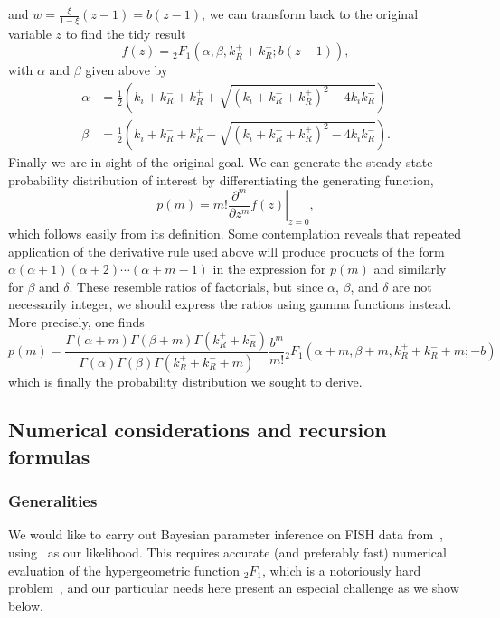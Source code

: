 and $w = \frac{\xi}{1-\xi} (z-1) = b (z-1)$,
we can transform back to the original variable $z$ to find the tidy result
\begin{equation}
f(z) =  {_2F_1}(\alpha, \beta, k_R^+ + k_R^-; b(z-1)),
\end{equation}
with $\alpha$ and $\beta$ given above by
\begin{equation}
\begin{split}
\alpha &= \frac{1}{2}
\left(k_i+k_R^-+k_R^+ + \sqrt{(k_i+k_R^-+k_R^+)^2 - 4k_i k_R^-}\right)
\\
\beta &= \frac{1}{2}
\left(k_i+k_R^-+k_R^+ - \sqrt{(k_i+k_R^-+k_R^+)^2 - 4k_i k_R^-}\right).
\end{split}
\end{equation}
Finally we are in sight of the original goal. We can generate the steady-state
probability distribution of interest by differentiating the generating function,
\begin{equation}
p(m) = m! \left.\frac{\partial^m}{\partial z^m} f(z) \right|_{z=0},
\end{equation}
which follows easily from its definition. Some contemplation reveals that
repeated application of the derivative rule used above will produce products of
the form $\alpha(\alpha+1)(\alpha+2)\cdots(\alpha+m-1)$ in the expression for
$p(m)$ and similarly for $\beta$ and $\delta$. These resemble ratios of
factorials, but since $\alpha$, $\beta$, and $\delta$ are not necessarily
integer, we should express the ratios using gamma functions instead. More
precisely, one finds
\begin{equation}
p(m) = \frac{
        \Gamma(\alpha + m)\Gamma(\beta + m)\Gamma(k_R^+ + k_R^-)
        }
        {
        \Gamma(\alpha)\Gamma(\beta)\Gamma(k_R^+ + k_R^- + m)
        }
\frac{b^m}{m!}{_2F_1}(\alpha+m, \beta+m, k_R^++k_R^-+m; -b)
\label{eq:p_m_bursty+rep_appdx}
\end{equation}
which is finally the probability distribution we sought to derive.

\subsection{Numerical considerations and recursion formulas}
\subsubsection{Generalities}
We would like to carry out Bayesian parameter inference on FISH data
from~\cite{Jones2014}, using~ as our
likelihood. This requires accurate (and preferably fast)
numerical evaluation of the hypergeometric function ${_2F_1}$,
which is a notoriously hard problem~\cite{Pearson2017, Gil2007},
and our particular needs here present an especial challenge as we show below.


